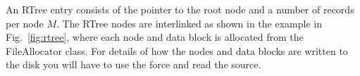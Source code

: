 An RTree entry consists of the pointer to the root node and a number
of records per node $M$. The RTree nodes are interlinked as shown in
the example in Fig.~\ref{fig:rtree}, where each node and data block is
allocated from the FileAllocator class. For details of how the nodes
and data blocks are written to the disk you will have to use the force
and read the source.
